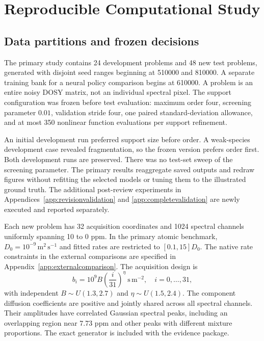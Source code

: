 \section{Reproducible Computational Study}\label{sec:experiments}
\subsection{Data partitions and frozen decisions}
The primary study contains 24 development problems and 48 new test problems, generated with disjoint seed ranges beginning at 510000 and 810000. A separate training bank for a neural policy comparison begins at 610000. A problem is an entire noisy DOSY matrix, not an individual spectral pixel. The support configuration was frozen before test evaluation: maximum order four, screening parameter $0.01$, validation stride four, one paired standard-deviation allowance, and at most 350 nonlinear function evaluations per support refinement.

An initial development run preferred support size before order. A weak-species development case revealed fragmentation, so the frozen version prefers order first. Both development runs are preserved. There was no test-set sweep of the screening parameter. The primary results reaggregate saved outputs and redraw figures without refitting the selected models or tuning them to the illustrated ground truth. The additional post-review experiments in Appendices~\ref{app:revisionvalidation} and \ref{app:completevalidation} are newly executed and reported separately.

Each new problem has 32 acquisition coordinates and 1024 spectral channels uniformly spanning 10 to 0 ppm. In the primary atomic benchmark, $D_0=10^{-9}\,\mathrm{m^2\,s^{-1}}$ and fitted rates are restricted to $[0.1,15]D_0$. The native rate constraints in the external comparisons are specified in Appendix~\ref{app:externalcomparison}. The acquisition design is
\begin{equation}\label{eq:design}
 b_i=10^9 B\left(\frac{i}{31}\right)^\eta\ \mathrm{s\,m^{-2}},
 \quad i=0,\ldots,31,
\end{equation}
with independent $B\sim U(1.3,2.7)$ and $\eta\sim U(1.5,2.4)$. The component diffusion coefficients are positive and jointly shared across all spectral channels. Their amplitudes have correlated Gaussian spectral peaks, including an overlapping region near 7.73 ppm and other peaks with different mixture proportions. The exact generator is included with the evidence package.

